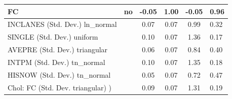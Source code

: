 \begin{table}
\begin{center}
\begin{tabular}{|l|l|c|c|c|l|}
			\hline
			FC & no & -0.05 & 1.00 & -0.05 & 0.96 \\
			\hline
			INCLANES (Std. Dev.) ln_normal &  & 0.07 & 0.07 & 0.99 & 0.32 \\
			\hline
			SINGLE (Std. Dev.) uniform &  & 0.10 & 0.07 & 1.36 & 0.17 \\
			\hline
			AVEPRE (Std. Dev.) triangular &  & 0.06 & 0.07 & 0.84 & 0.40 \\
			\hline
			INTPM (Std. Dev.) tn_normal &  & 0.10 & 0.07 & 1.35 & 0.18 \\
			\hline
			HISNOW (Std. Dev.) tn_normal &  & 0.05 & 0.07 & 0.72 & 0.47 \\
			\hline
			 Chol: FC (Std. Dev. triangular) ) &  & 0.09 & 0.07 & 1.31 & 0.19 \\
			\hline
		\end{tabular}
	\end{center}
\end{table}
